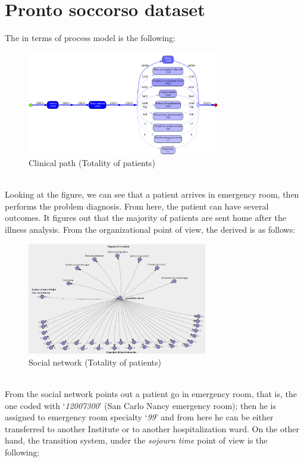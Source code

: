 \section{Pronto soccorso dataset}\label{analysis:2}
The  in terms of process model is the following:
\begin{figure} [htbp]
\includegraphics[width=0.75\textwidth, keepaspectratio]{ProntoSoccorsoInductiveVisualMiner}
\caption{Clinical path (Totality of patients)}
\end{figure}\\
Looking at the figure, we can see that a patient arrives in emergency room, then performs the problem diagnosis. From here, the patient can have several outcomes. It figures out that the majority of patients are sent home after the illness analysis. From the organizational point of view, the  derived is as follows:
\begin{figure} [htbp]
\includegraphics[width=0.7\textwidth, keepaspectratio]{ProntoSoccorsoSocialNetwork}
\caption{Social network (Totality of patients)}
\end{figure}\\
From the social network points out a patient go in emergency room, that is, the one coded with `\textit{12007300}' (San Carlo Nancy emergency room); then he is assigned to emergency room specialty `\textit{99}' and from here he can be either transferred to another Institute or to another hospitalization ward. On the other hand, the transition system, under the \textit{sojourn time} point of view is the following:
